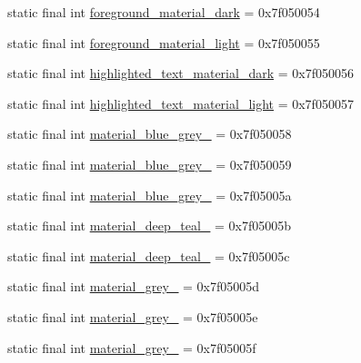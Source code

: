 \begin{DoxyCompactItemize}
\item 
static final int \mbox{\hyperlink{classcom_1_1google_1_1android_1_1gms_1_1R_1_1color_a44f5b87504074f454400a220d8750457}{foreground\+\_\+material\+\_\+dark}} = 0x7f050054
\item 
static final int \mbox{\hyperlink{classcom_1_1google_1_1android_1_1gms_1_1R_1_1color_aa8cde2af617acaf127a1755230c9418f}{foreground\+\_\+material\+\_\+light}} = 0x7f050055
\item 
static final int \mbox{\hyperlink{classcom_1_1google_1_1android_1_1gms_1_1R_1_1color_a5a8d95065cc56ef3c6fae2606bd2faf1}{highlighted\+\_\+text\+\_\+material\+\_\+dark}} = 0x7f050056
\item 
static final int \mbox{\hyperlink{classcom_1_1google_1_1android_1_1gms_1_1R_1_1color_a74cabb7b192161ce78fc8004e29ca4e5}{highlighted\+\_\+text\+\_\+material\+\_\+light}} = 0x7f050057
\item 
static final int \mbox{\hyperlink{classcom_1_1google_1_1android_1_1gms_1_1R_1_1color_a83e8636fcdf5a6436073b97857c5f00b}{material\+\_\+blue\+\_\+grey\+\_}} = 0x7f050058
\item 
static final int \mbox{\hyperlink{classcom_1_1google_1_1android_1_1gms_1_1R_1_1color_a073481e3aed3290d7f01f6961d76e1bc}{material\+\_\+blue\+\_\+grey\+\_}} = 0x7f050059
\item 
static final int \mbox{\hyperlink{classcom_1_1google_1_1android_1_1gms_1_1R_1_1color_ab772d7c1a7fd64a2a88c8adbda421913}{material\+\_\+blue\+\_\+grey\+\_}} = 0x7f05005a
\item 
static final int \mbox{\hyperlink{classcom_1_1google_1_1android_1_1gms_1_1R_1_1color_a50e8a822f04bdd196d7870796b84aee1}{material\+\_\+deep\+\_\+teal\+\_}} = 0x7f05005b
\item 
static final int \mbox{\hyperlink{classcom_1_1google_1_1android_1_1gms_1_1R_1_1color_a135d781f3e5a898a4816a2e65184a8ee}{material\+\_\+deep\+\_\+teal\+\_}} = 0x7f05005c
\item 
static final int \mbox{\hyperlink{classcom_1_1google_1_1android_1_1gms_1_1R_1_1color_a9c9048660ed14dcd75b3ab1c87ca9007}{material\+\_\+grey\+\_}} = 0x7f05005d
\item 
static final int \mbox{\hyperlink{classcom_1_1google_1_1android_1_1gms_1_1R_1_1color_aee3d0832164f161d26e53cf4f693da18}{material\+\_\+grey\+\_}} = 0x7f05005e
\item 
static final int \mbox{\hyperlink{classcom_1_1google_1_1android_1_1gms_1_1R_1_1color_a0f9810cc6d3148c4bd6c519e4186972a}{material\+\_\+grey\+\_}} = 0x7f05005f

\end{DoxyCompactItemize}

